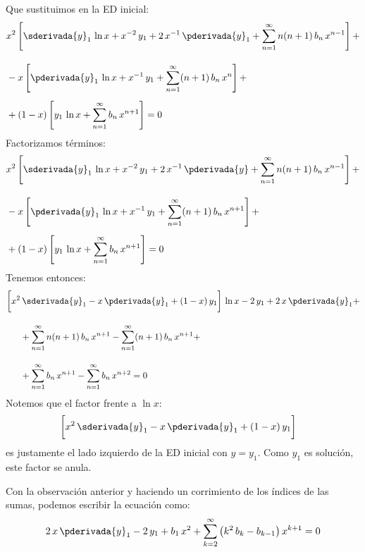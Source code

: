 \begin{ejemplo}
Que sustituimos en la ED inicial:
\begin{align*}
&x^{2} \left[ \sderivada{y}_{1} \, \ln x + x^{-2} \, y_{1} + 2 \, x^{-1} \, \pderivada{y}_{1} + \sum_{n=1}^{\infty} n (n + 1) \, b_{n} \, x^{n-1} \right] + \\[1em]
&- x \left[ \pderivada{y}_{1} \, \ln x + x^{-1} \, y_{1} + \sum_{n=1}^{\infty} (n + 1) \, b_{n} \, x^{n} \right] + \\[0.5em]
&+ (1 - x) \left[ y_{1} \, \ln x + \sum_{n=1}^{\infty} b_{n} \, x^{n+1} \right] = 0
\end{align*}
Factorizamos términos:
\fontsize{12}{12}\selectfont
\begin{align*}
&x^{2} \left[ \sderivada{y}_{1} \, \ln x + x^{-2} \, y_{1} + 2 \, x^{-1} \, \pderivada{y} + \sum_{n=1}^{\infty} n (n + 1) \, b_{n} \, x^{n-1} \right] + \\[1em]
&- x \left[ \pderivada{y}_{1} \, \ln x + x^{-1} \, y_{1} + \sum_{n=1}^{\infty} (n + 1) \, b_{n} \, x^{n+1} \right] + \\[0.5em]
&+ (1 - x) \left[ y_{1} \, \ln x + \sum_{n=1}^{\infty} b_{n} \, x^{n+1} \right] = 0
\end{align*}
Tenemos entonces:
\begin{align*}
\bigg[ x^{2} &\, \sderivada{y}_{1} - x \, \pderivada{y}_{1} + (1 - x) \, y_{1} \bigg] \, \ln x - 2 \, y_{1} +  2 \, x \, \pderivada{y}_{1} + \\[1em]
& + \sum_{n=1}^{\infty} n (n + 1) \, b_{n} \, x^{n+1} - \sum_{n=1}^{\infty} (n + 1) \, b_{n} \, x^{n+1} + \\[1em]
&+ \sum_{n=1}^{\infty} b_{n} \, x^{n+1} - \sum_{n=1}^{\infty} b_{n} \, x^{n+2} = 0
\end{align*} 
Notemos que el factor frente a $\ln x$:
\begin{align*}
\bigg[ x^{2} &\, \sderivada{y}_{1} - x \, \pderivada{y}_{1} + (1 - x) \, y_{1} \bigg]
\end{align*}
es justamente el lado izquierdo de la ED inicial con $y = y_{1}$. Como $y_{1}$ es solución, este factor se anula.

\par
Con la observación anterior y haciendo un corrimiento de los índices de las sumas, podemos escribir la ecuación como:
\begin{align*}
2 \, x \, \pderivada{y}_{1} -  2 \, y_{1} + b_{1} \, x^{2} +  \sum_{k=2}^{\infty} \big( k^{2} \, b_{k} - b_{k-1} \big) \, x^{k+1} = 0
\end{align*}


\end{ejemplo}
